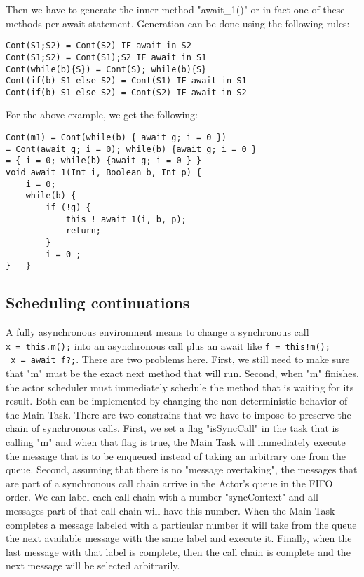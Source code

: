 Then we have to generate the inner method "await\_1()" or in fact one of these methods per await statement. Generation can be done using the following rules:

\begin{lstlisting}
Cont(S1;S2) = Cont(S2) IF await in S2
Cont(S1;S2) = Cont(S1);S2 IF await in S1
Cont(while(b){S}) = Cont(S); while(b){S}
Cont(if(b) S1 else S2) = Cont(S1) IF await in S1
Cont(if(b) S1 else S2) = Cont(S2) IF await in S2
\end{lstlisting}
For the above example, we get the following:

\begin{lstlisting}
Cont(m1) = Cont(while(b) { await g; i = 0 })
= Cont(await g; i = 0); while(b) {await g; i = 0 }
= { i = 0; while(b) {await g; i = 0 } }
void await_1(Int i, Boolean b, Int p) {
	i = 0; 
	while(b) {
		if (!g) {
			this ! await_1(i, b, p);
			return;
		}
		i = 0 ;
}	}
\end{lstlisting}

\subsection{Scheduling continuations}
A fully asynchronous environment means to change a synchronous call \\ \lstinline|x = this.m();| into an asynchronous call plus an await like \lstinline|f = this!m();| \\ \lstinline| x = await f?;|. There are two problems here. First, we still need to make sure that "m" must be the exact next method that will run. Second, when "m" finishes, the actor scheduler must immediately schedule the method that is waiting for its result. Both can be implemented by changing the non-deterministic behavior of the Main Task. There are two constrains that we have to impose to preserve the chain of synchronous calls. First, we set a flag "isSyncCall" in the task that is calling "m" and when that flag is true, the Main Task will immediately execute the message that is to be enqueued instead of taking an arbitrary one from the queue. Second, assuming that there is no "message overtaking", the messages that are part of a synchronous call chain arrive in the Actor's queue in the FIFO order. We can label each call chain with a number "syncContext" and all messages part of that call chain will have this number. When the Main Task completes a message labeled with a particular number it will take from the queue the next available message with the same label and execute it. Finally, when the last message with that label is complete, then the call chain is complete and the next message will be selected arbitrarily.


